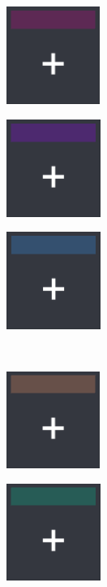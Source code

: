 \begin{figure}[h] 
	\centering
	\begin{subfigure}{0.1975\textwidth}
		\centering
		\includegraphics[scale=1, frame]{gui-imgs/player1disabledpanel}
	\end{subfigure}
	\begin{subfigure}{0.1975\textwidth}
		\centering
		\includegraphics[scale=1, frame]{gui-imgs/player2disabledpanel}
	\end{subfigure}
	\begin{subfigure}{0.1975\textwidth}
		\centering
		\includegraphics[scale=1, frame]{gui-imgs/player3disabledpanel}
	\end{subfigure} \\
	\begin{subfigure}{0.1975\textwidth}
		\centering
		\includegraphics[scale=1, frame]{gui-imgs/player4disabledpanel}
	\end{subfigure}
	\begin{subfigure}{0.1975\textwidth}
		\centering
		\includegraphics[scale=1, frame]{gui-imgs/player5disabledpanel}

\end{subfigure}
\end{figure}
